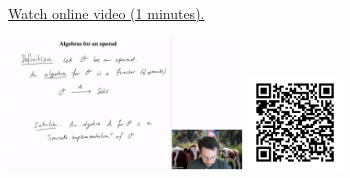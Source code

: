 
\begin{minipage}{10cm}
    \href{https://act4e-spring21.netlify.app/videos/spring2021-operads-b:operad-algebras.html}{Watch online video (1 minutes).}
        
    \href{https://act4e-spring21.netlify.app/videos/spring2021-operads-b:operad-algebras.html}{\includegraphics[height=3.5cm]{spring2021-operads-b:operad-algebras/thumbnails.jpg}}
    \href{https://act4e-spring21.netlify.app/videos/spring2021-operads-b:operad-algebras.html}{\includegraphics[height=2.5cm]{spring2021-operads-b:operad-algebras/qrcode.png}}
\end{minipage}
